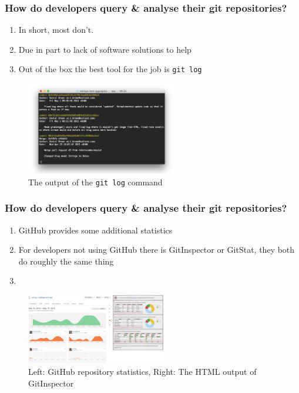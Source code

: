 \documentclass[aspectratio=1610]{beamer}
\newcommand{\code}[1]{\texttt{#1}}
\begin{document}
\begin{frame}
\frametitle{How do developers query \& analyse their git repositories?}
\begin{enumerate}
	\item In short, most don't.
	\item Due in part to lack of software solutions to help
	\item Out of the box the best tool for the job is \code{git log}
\end{enumerate}

\begin{figure}[H]
	\centering
	\includegraphics[width=250px]{images/git-log.png}
	\caption{The output of the \code{git log} command}
\end{figure} 
\end{frame}

\begin{frame}
\frametitle{How do developers query \& analyse their git repositories?}
\begin{enumerate}
	\item GitHub provides some additional statistics 
	\item For developers not using GitHub there is GitInspector or GitStat, they both do roughly the same thing
	\item {}\vspace{10 mm}
\end{enumerate}
\begin{figure}[H]
	\centering
	\includegraphics[width=230px]{images/github-analytics-gitinspector-analytics.png}
	\caption{Left: GitHub repository statistics, Right: The HTML output of GitInspector}
\end{figure} 
\end{frame}
\end{document}
